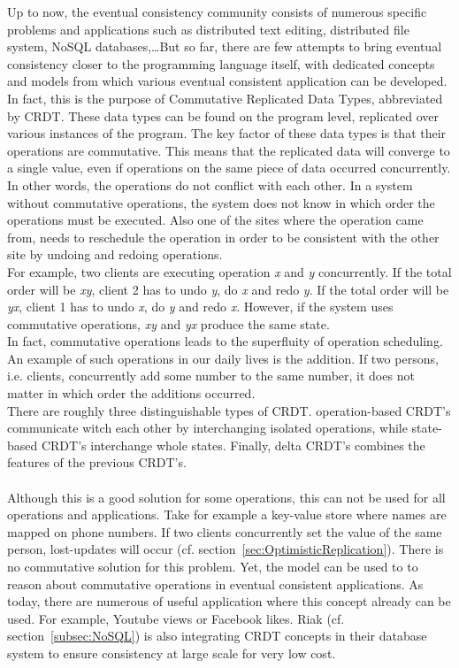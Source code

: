 \documentclass[a4paper,12pt]{report}
\begin{document}
Up to now, the eventual consistency community consists of numerous specific problems and applications such as distributed text editing, distributed file system, NoSQL databases,\ldots  But so far, there are few attempts to bring eventual consistency closer to the programming language itself, with dedicated concepts and models from which various eventual consistent application can be developed. In fact, this is the purpose of Commutative Replicated Data Types, abbreviated by CRDT. These data types can be found on the program level, replicated over various instances of the program. The key factor of these data types is that their operations are commutative. This means that the replicated data will converge to a single value, even if operations on the same piece of data occurred concurrently. In other words, the operations do not conflict with each other. In a system without commutative operations, the system does not know in which order the operations must be executed. Also one of the sites where the operation came from, needs to reschedule the operation in order to be consistent with the other site by undoing and redoing operations. \\
\indent For example, two clients are executing operation \textit{x} and \textit{y} concurrently. If the total order will be \textit{xy}, client 2 has to undo \textit{y}, do \textit{x} and redo \textit{y}. If the total order will be \textit{yx}, client 1 has to undo \textit{x}, do \textit{y} and redo \textit{x}. However, if the system uses commutative operations, \textit{xy} and \textit{yx} produce the same state. \\
In fact, commutative operations leads to the superfluity of operation scheduling. An example of such operations in our daily lives is the addition. If two persons, i.e. clients, concurrently add some number to the same number, it does not matter in which order the additions occurred. \\
There are roughly three distinguishable types of CRDT. operation-based CRDT's communicate witch each other by interchanging isolated operations, while state-based CRDT's interchange whole states. Finally, delta CRDT's combines the features of the previous CRDT's. \\ 
\\
Although this is a good solution for some operations, this can not be used for all operations and applications. Take for example a key-value store where names are mapped on phone numbers. If two clients concurrently set the value of the same person, lost-updates will occur (cf. section~\ref{sec:OptimisticReplication}). There is no commutative solution for this problem. Yet, the model can be used to to reason about commutative operations in eventual consistent applications. As today, there are numerous of useful application where this concept already can be used. For example, Youtube views or Facebook likes. Riak (cf. section~\ref{subsec:NoSQL}) is also integrating CRDT concepts in their database system to ensure consistency at large scale for very low cost. 
\end{document}
